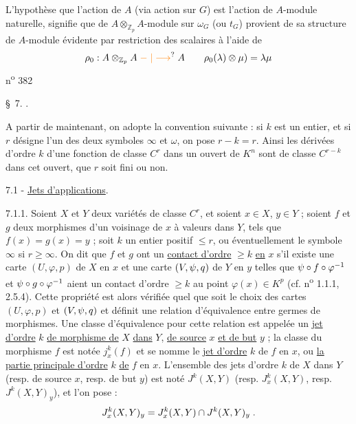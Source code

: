 L'hypothèse que l'action de $A$  (via action sur $G$) est l'action de $A$-module naturelle, signifie que   de $A\otimes_{\mathbb Z_p}A$-module sur $\omega_G$ (ou $t_G$)  provient de sa structure de $A$-module  évidente par restriction des scalaires à l'aide de
\[
\rho_0:A\otimes_{\mathbb Z_p}A\mathrel{\unsure{\relbar|\longrightarrow}} A\qquad \rho_0(\lambda)\otimes\mu)=\lambda\mu
\]
\hfill n\textsuperscript{o} 382

\S\ 7. .

A partir de maintenant, on adopte la convention suivante : si $k$ est un entier, et si $r$ désigne l'un des deux symboles $\infty$ et $\omega$, on pose $r-k=r$. Ainsi les dérivées d'ordre $k$ d'une fonction de classe $C^r$ dans un ouvert de $K^n$ sont de classe $C^{r-k}$ dans cet ouvert, que $r$ soit fini ou non.

7.1 - \uline{Jets d'applications}.

7.1.1. Soient $X$ et $Y$ deux variétés de classe $C^r$, et soient $x\in X$, $y\in Y$ ; soient $f$ et $g$ deux morphismes d'un voisinage de $x$ à valeurs dans $Y$, tels que $f(x)=g(x)=y$ ; soit $k$ un entier positif $\leq r$, ou éventuellement le symbole $\infty$ si $r\geq\infty$. On dit que $f$ et $g$ ont un \uline{contact d'ordre} $\geq k$ \uline{en} $x$ s'il existe une carte $(U,\varphi,p)$ de $X$ en $x$ et une carte $(V,\psi,q)$ de $Y$ en $y$ telles que $\psi\circ f\circ\varphi^{-1}$ et $\psi\circ g\circ\varphi^{-1}$ aient un contact d'ordre $\geq k$ au point $\varphi(x)\in K^p$ (cf. n\textsuperscript{o} 1.1.1, 2.5.4). Cette propriété est alors vérifiée quel que soit le choix des cartes $(U,\varphi,p)$ et $(V,\psi,q)$ et définit une relation d'équivalence entre germes de morphismes. Une classe d'équivalence pour cette relation est appelée un \uline{jet d'ordre} $k$ \uline{de morphisme de} $X$ \uline{dans} $Y$, \uline{de source} $x$ \uline{et de but} $y$ ; la classe du morphisme $f$ est notée $j^k_x(f)$ et se nomme le \uline{jet d'ordre} $k$ de $f$ en $x$, ou \uline{la partie principale d'ordre} $k$ \uline{de} $f$ en $x$. L'ensemble des jets d'ordre $k$ de $X$ dans $Y$ (resp. de source $x$,  resp. de but $y$) est noté $J^k(X,Y)$ (resp. $J^k_x(X,Y)$, resp. $J^k(X,Y)_y$), et l'on pose :
\[
J^k_x(X,Y)_y=J^k_x(X,Y)\cap J^k(X,Y)_y\;.
\]

